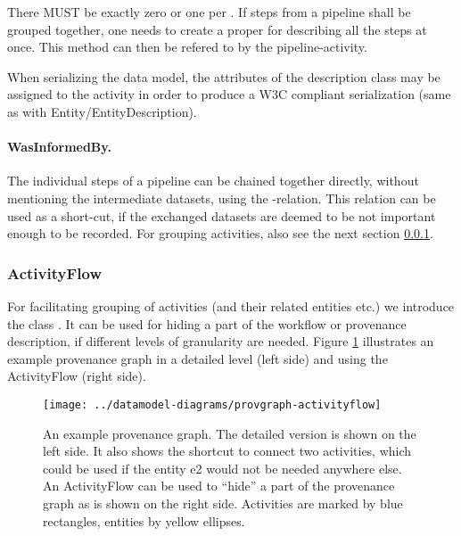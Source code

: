 There MUST be exactly zero or one  per . If steps from a 
pipeline shall be grouped together, one needs to create a proper 
 for describing all the steps at once. This method can then 
be refered to by the pipeline-activity. 

When serializing the data model, the attributes
of the description class may be assigned to the activity in order to produce 
a W3C compliant serialization (same as with Entity/EntityDescription).


\paragraph{WasInformedBy.}
The individual steps of a pipeline can be chained
together directly, without mentioning the intermediate datasets, using the -relation.
This relation can be used as a short-cut, if the exchanged datasets are deemed to be not important
enough to be recorded. For grouping activities, also see the 
next section \ref{sec:activityflow}.


\subsubsection{ActivityFlow}\label{sec:activityflow}
For facilitating grouping of activities (and their related entities etc.)
we introduce the class .
It can be used for hiding a part of the workflow or provenance 
description, if different levels of granularity are needed. Figure \ref{fig:provgraph-activityflow}
illustrates an example provenance graph in a detailed level (left side) 
and using the ActivityFlow (right side).


\begin{figure}[h]
\centering
\texttt{[image: ../datamodel-diagrams/provgraph-activityflow]}
\caption{An example provenance graph. The detailed version is shown on the left side. It also shows
the shortcut  to connect two activities, which could be used if the entity e2 
would not be needed anywhere else. 
An ActivityFlow can be used to ``hide'' a part of the provenance graph as is shown on the right side.
Activities are marked by blue rectangles, entities by yellow ellipses.}
\label{fig:provgraph-activityflow}
\end{figure}



